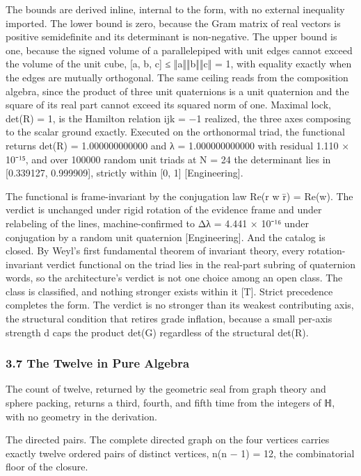 \documentclass[10pt,twocolumn]{article}
\begin{document}
The bounds are derived inline, internal to the form, with no external
inequality imported. The lower bound is zero, because the Gram matrix of
real vectors is positive semidefinite and its determinant is
non-negative. The upper bound is one, because the signed volume of a
parallelepiped with unit edges cannot exceed the volume of the unit
cube, {[}a, b, c{]} ≤ ‖a‖‖b‖‖c‖ = 1, with equality exactly when the
edges are mutually orthogonal. The same ceiling reads from the
composition algebra, since the product of three unit quaternions is a
unit quaternion and the square of its real part cannot exceed its
squared norm of one. Maximal lock, det(R) = 1, is the Hamilton relation
ijk = −1 realized, the three axes composing to the scalar ground
exactly. Executed on the orthonormal triad, the functional returns
det(R) = 1.000000000000 and \textbar λ\textbar{} = 1.000000000000 with
residual 1.110 × 10⁻¹⁵, and over 100000 random unit triads at N = 24 the
determinant lies in {[}0.339127, 0.999909{]}, strictly within {[}0, 1{]}
{[}Engineering{]}.

The functional is frame-invariant by the conjugation law Re(r w r̄) =
Re(w). The verdict is unchanged under rigid rotation of the evidence
frame and under relabeling of the lines, machine-confirmed to
\textbar Δλ\textbar{} = 4.441 × 10⁻¹⁶ under conjugation by a random unit
quaternion {[}Engineering{]}. And the catalog is closed. By Weyl's first
fundamental theorem of invariant theory, every rotation-invariant
verdict functional on the triad lies in the real-part subring of
quaternion words, so the architecture's verdict is not one choice among
an open class. The class is classified, and nothing stronger exists
within it {[}T{]}. Strict precedence completes the form. The verdict is
no stronger than its weakest contributing axis, the structural condition
that retires grade inflation, because a small per-axis strength d caps
the product det(G) regardless of the structural det(R).

\hypertarget{the-twelve-in-pure-algebra}{%
\subsubsection{3.7 The Twelve in Pure
Algebra}\label{the-twelve-in-pure-algebra}}

The count of twelve, returned by the geometric seal from graph theory
and sphere packing, returns a third, fourth, and fifth time from the
integers of ℍ, with no geometry in the derivation.

The directed pairs. The complete directed graph on the four vertices
carries exactly twelve ordered pairs of distinct vertices, n(n − 1) =
12, the combinatorial floor of the closure.
\end{document}
